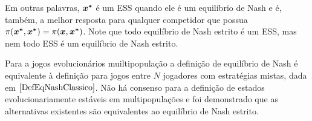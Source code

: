 Em outras palavras, $\boldsymbol{x^*}$ é um ESS quando ele é um equilíbrio de Nash e é, também, a melhor resposta para qualquer competidor que possua $\pi(\boldsymbol{x^*},\boldsymbol{x^*}) = \pi(\boldsymbol{x},\boldsymbol{x^*})$. Note que todo equilíbrio de Nash estrito é um ESS, mas nem todo ESS é um equilíbrio de Nash estrito.

Para a jogos evolucionários muiltipopulação a definição de equilíbrio de Nash é equivalente à definição para jogos entre $N$ jogadores com estratégias mistas, dada em $\eqref{DefEqNashClassico}$. Não há consenso para a definição de estados evolucionariamente estáveis em multipopulações \cite{weibull1997evolutionary} e foi demonstrado que as alternativas existentes são equivalentes ao equilíbrio de Nash estrito.